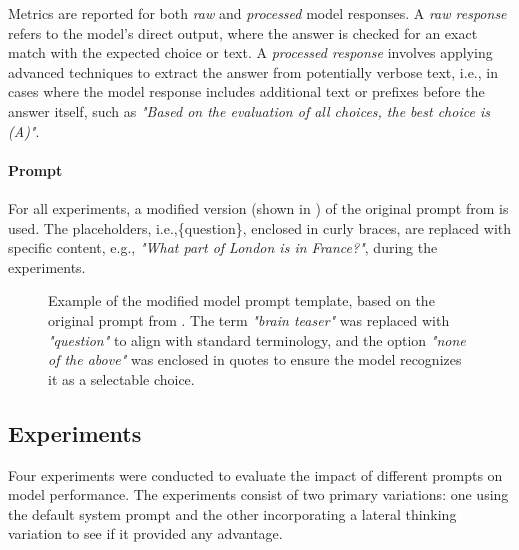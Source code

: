 Metrics are reported for both \textit{raw} and \textit{processed} model responses. A \textit{raw response} refers to the model's direct output, where the answer is checked for an exact match with the expected choice or text. A \textit{processed response} involves applying advanced techniques to extract the answer from potentially verbose text, i.e., in cases where the model response includes additional text or prefixes before the answer itself, such as \textit{"Based on the evaluation of all choices, the best choice is (A)"}.

\paragraph{Prompt}
For all experiments, a modified version (shown in ) of the original prompt from \textcite{jiangBRAINTEASERLateralThinking2023} is used. The placeholders, i.e.,\{question\}, enclosed in curly braces, are replaced with specific content, e.g., \textit{"What part of London is in France?"}, during the experiments.

\begin{figure}[htb]
  \centering
  \caption{Example of the modified model prompt template, based on the original prompt from \textcite{jiangBRAINTEASERLateralThinking2023}. The term \textit{"brain teaser"} was replaced with \textit{"question"} to align with standard terminology, and the option \textit{"none of the above"} was enclosed in quotes to ensure the model recognizes it as a selectable choice.}
  \label{fig:prompt-template}
\end{figure}

\subsection{Experiments}

Four experiments were conducted to evaluate the impact of different prompts on model performance. The experiments consist of two primary variations: one using the default system prompt and the other incorporating a lateral thinking variation to see if it provided any advantage.

